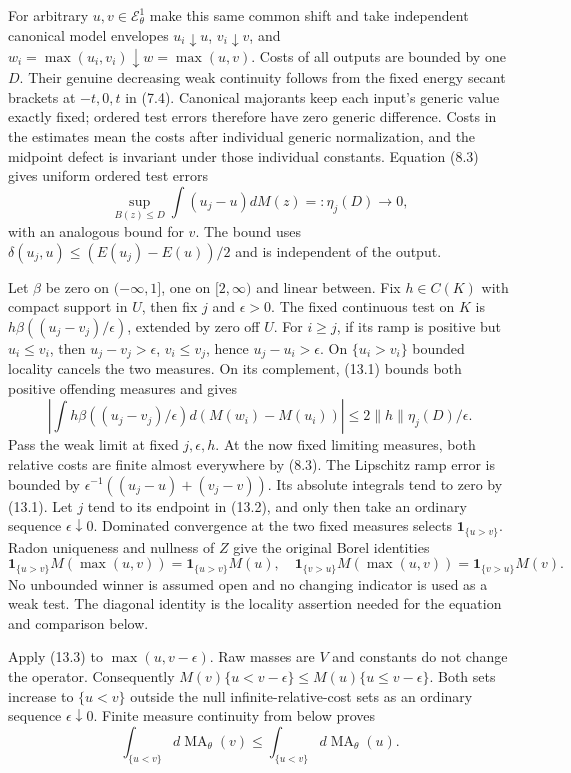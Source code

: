 \documentclass[10pt]{article}
\newcommand{\MA}{\operatorname{MA}}
\newcommand{\EE}{\mathcal E^1_\theta}
\begin{document}
For arbitrary $u,v\in\EE$ make this same common shift and take independent canonical model
envelopes $u_i\downarrow u$, $v_i\downarrow v$, and
$w_i=\max(u_i,v_i)\downarrow w=\max(u,v)$. Costs of all outputs
are bounded by one $D$. Their genuine decreasing weak continuity follows
from the fixed energy secant brackets at $-t,0,t$ in (7.4).
Canonical majorants keep each input's generic value exactly fixed;
ordered test errors therefore have zero generic difference. Costs in the
estimates mean the costs after individual generic normalization, and the
midpoint defect is invariant under those individual constants.
Equation (8.3) gives uniform ordered test errors
\[
 \sup_{B(z)\leq D}\int(u_j-u)dM(z)=:\eta_j(D)\to0,
 \tag{13.1}
\]
with an analogous bound for $v$. The bound uses
$\delta(u_j,u)\leq(E(u_j)-E(u))/2$ and is independent of the output.

Let $\beta$ be zero on $(-\infty,1]$, one on $[2,\infty)$ and linear
between. Fix $h\in C(K)$ with compact support in $U$, then fix $j$ and
$\epsilon>0$. The fixed continuous test on $K$ is
$h\beta((u_j-v_j)/\epsilon)$, extended by zero off $U$.
For $i\geq j$, if its ramp is positive but $u_i\leq v_i$, then
$u_j-v_j>\epsilon$, $v_i\leq v_j$, hence $u_j-u_i>\epsilon$.
On $\{u_i>v_i\}$ bounded locality cancels the two measures. On its
complement, (13.1) bounds both positive offending measures and gives
\[
 |\int h\beta((u_j-v_j)/\epsilon)d(M(w_i)-M(u_i))|
       \leq2\|h\|\eta_j(D)/\epsilon.
 \tag{13.2}
\]
Pass the weak limit at fixed $j,\epsilon,h$. At the now fixed limiting
measures, both relative costs are finite almost everywhere by (8.3).
The Lipschitz ramp error is bounded by
$\epsilon^{-1}((u_j-u)+(v_j-v))$. Its absolute integrals tend to zero
by (13.1). Let $j$ tend to its endpoint in (13.2), and only then take
an ordinary sequence $\epsilon\downarrow0$. Dominated convergence at
the two fixed measures selects $\mathbf1_{\{u>v\}}$.
Radon uniqueness and nullness of $Z$ give the original Borel identities
\[
 \mathbf1_{\{u>v\}}M(\max(u,v))=\mathbf1_{\{u>v\}}M(u),
 \quad
 \mathbf1_{\{v>u\}}M(\max(u,v))=\mathbf1_{\{v>u\}}M(v).
 \tag{13.3}
\]
No unbounded winner is assumed open and no changing indicator is used
as a weak test. The diagonal identity is the locality assertion needed
for the equation and comparison below.

Apply (13.3) to $\max(u,v-\epsilon)$. Raw masses are $V$ and constants
do not change the operator. Consequently
$M(v)\{u<v-\epsilon\}\leq M(u)\{u\leq v-\epsilon\}$.
Both sets increase to $\{u<v\}$ outside the null infinite-relative-cost
sets as an ordinary sequence $\epsilon\downarrow0$. Finite measure
continuity from below proves
\[
 \int_{\{u<v\}}d\MA_\theta(v)\leq
       \int_{\{u<v\}}d\MA_\theta(u).
 \tag{13.4}
\]
\end{document}
